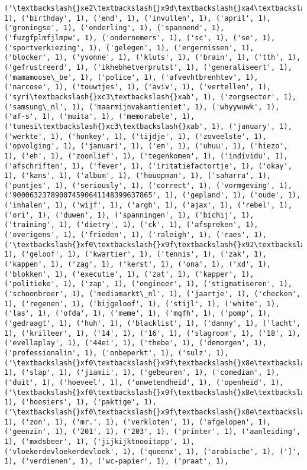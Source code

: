 \documentclass{article}
\begin{document}
\begin{Verbatim}[commandchars=\\\{\}]
('\textbackslash{}xe2\textbackslash{}x9d\textbackslash{}xa4\textbackslash{}xef\textbackslash{}xb8\textbackslash{}x8fydvrc\textbackslash{}xe2\textbackslash{}x88\textbackslash{}x9eaamp\textbackslash{}xe2\textbackslash{}x9d\textbackslash{}xa4\textbackslash{}xef\textbackslash{}xb8\textbackslash{}x8f', 1), ('birthday', 1), ('end', 1), ('invullen', 1), ('april', 1), ('groningse', 1), ('onderling', 1), ('spannend', 1), ('fuzgfplmfjlmpw', 1), ('ondernemers', 1), ('sc', 1), ('se', 1), ('sportverkiezing', 1), ('gelegen', 1), ('ergernissen', 1), ('blocker', 1), ('yvonne', 1), ('kluts', 1), ('brain', 1), ('tth', 1), ('gefrustreerd', 1), ('ikhebhetverprutst', 1), ('generaliseert', 1), ('mamamoose\_be', 1), ('police', 1), ('afvevhtbrenhtev', 1), ('narcose', 1), ('touwtjes', 1), ('aviv', 1), ('vertellen', 1), ('syri\textbackslash{}xc3\textbackslash{}xab', 1), ('zorgsector', 1), ('samsung\_nl', 1), ('maarmijnvakantieniet', 1), ('whyywuwk', 1), ('af-s', 1), ('muita', 1), ('memorabele', 1), ('tunesi\textbackslash{}xc3\textbackslash{}xab', 1), ('january', 1), ('werkte', 1), ('honkey', 1), ('tijdje', 1), ('zoveelste', 1), ('opvolging', 1), ('januari', 1), ('em', 1), ('uhuu', 1), ('hiezo', 1), ('eh', 1), ('zoonlief', 1), ('tegenkomen', 1), ('individu', 1), ('afschriften', 1), ('fever', 1), ('iritatiefactortje', 1), ('okay', 1), ('kans', 1), ('album', 1), ('houopman', 1), ('saharra', 1), ('puntjes', 1), ('seriously', 1), ('correct', 1), ('vormgeving', 1), ('900063237890074590641148399637865', 1), ('gepland', 1), ('oude', 1), ('inhalen', 1), ('wijf', 1), ('argh', 1), ('ajax', 1), ('rebel', 1), ('ori', 1), ('duwen', 1), ('spanningen', 1), ('bichij', 1), ('training', 1), ('dietry', 1), ('ck', 1), ('afspreken', 1), ('overigens', 1), ('frieden', 1), ('raleigh', 1), ('raes', 1), ('\textbackslash{}xf0\textbackslash{}x9f\textbackslash{}x92\textbackslash{}x81', 1), ('geloof', 1), ('kwartier', 1), ('tennis', 1), ('zak', 1), ('kappen', 1), ('zag', 1), ('kerst', 1), ('ona', 1), ('xd', 1), ('blokken', 1), ('executie', 1), ('zat', 1), ('kapper', 1), ('politieke', 1), ('zap', 1), ('engineer', 1), ('stigmatiseren', 1), ('schoonbroer', 1), ('mediamarkt\_nl', 1), ('jaartje', 1), ('checken', 1), ('regenen', 1), ('bijgeloof', 1), ('stijl', 1), ('white', 1), ('las', 1), ('ofda', 1), ('meme', 1), ('mqfh', 1), ('pomp', 1), ('gedraagt', 1), ('huh', 1), ('blacklist', 1), ('danny', 1), ('lacht', 1), ('krilleer', 1), ('14', 1), ('16', 1), ('slagroom', 1), ('18', 1), ('evellaplay', 1), ('44ei', 1), ('thebe', 1), ('demorgen', 1), ('professionalin', 1), ('onbeperkt', 1), ('sulz', 1), ('\textbackslash{}xf0\textbackslash{}x9f\textbackslash{}x8e\textbackslash{}xa7', 1), ('slap', 1), ('jiamii', 1), ('gebeuren', 1), ('comedian', 1), ('duit', 1), ('hoeveel', 1), ('onwetendheid', 1), ('openheid', 1), ('\textbackslash{}xf0\textbackslash{}x9f\textbackslash{}x8e\textbackslash{}x89', 1), ('hoosiers', 1), ('paktige', 1), ('\textbackslash{}xf0\textbackslash{}x9f\textbackslash{}x8e\textbackslash{}x81', 1), ('zon', 1), ('mr.', 1), ('verkloten', 1), ('afgelopen', 1), ('geenzin', 1), ('201', 1), ('203', 1), ('printer', 1), ('aanleiding', 1), ('mxdsbeer', 1), ('jijkijktnooitapp', 1), ('vloekerdevloekerdevloek', 1), ('queenx', 1), ('arabische', 1), (']', 1), ('verdienen', 1), ('wc-papier', 1), ('praat', 1), 
\end{Verbatim}
\end{document}
